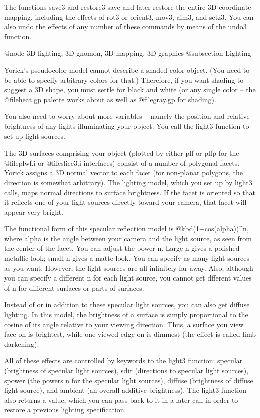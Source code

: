 The functions save3 and restore3 save and later restore the entire 3D
coordinate mapping, including the effects of rot3 or orient3, mov3,
aim3, and setz3.  You can also undo the effects of any number of these
commands by means of the undo3 function.

@node 3D lighting, 3D gnomon, 3D mapping, 3D graphics
@subsection Lighting

Yorick's pseudocolor model cannot describe a shaded color object.  (You
need to be able to specify arbitrary colors for that.)  Therefore, if
you want shading to suggest a 3D shape, you must settle for black and
white (or any single color -- the @file{heat.gp} palette works about as
well as @file{gray.gp} for shading).

You also need to worry about more variables -- namely the position and
relative brightness of any lights illuminating your object.  You call
the light3 function to set up light sources.

The 3D surfaces comprising your object (plotted by either plf or plfp
for the @file{plwf.i} or @file{slice3.i} interfaces) consist of a number
of polygonal facets.  Yorick assigns a 3D normal vector to each facet
(for non-planar polygons, the direction is somewhat arbitrary).  The
lighting model, which you set up by light3 calls, maps normal directions
to surface brightness.  If the facet is oriented so that it reflects one
of your light sources directly toward your camera, that facet will
appear very bright.

The functional form of this specular reflection model is
@kbd{(1+cos(alpha))^n}, where alpha is the angle between your camera and
the light source, as seen from the center of the facet.  You can adjust
the power n.  Large n gives a polished metallic look; small n gives a
matte look.  You can specify as many light sources as you want.
However, the light sources are all infinitely far away.  Also, although
you can specify a different n for each light source, you cannot get
dfferent values of n for different surfaces or parts of surfaces.

Instead of or in addition to these specular light sources, you can
also get diffuse lighting.  In this model, the brightness of a surface
is simply proportional to the cosine of its angle relative to your
viewing direction.  Thus, a surface you view face on is brightest,
while one viewed edge on is dimmest (the effect is called limb
darkening).

All of these effects are controlled by keywords to the light3
function: specular (brightness of specular light sources), sdir
(directions to specular light sources), spower (the powers n for the
specular light sources), diffuse (brightness of diffuse light source),
and ambient (an overall additive brightness).  The light3 function
also returns a value, which you can pass back to it in a later call
in order to restore a previous lighting specification.

